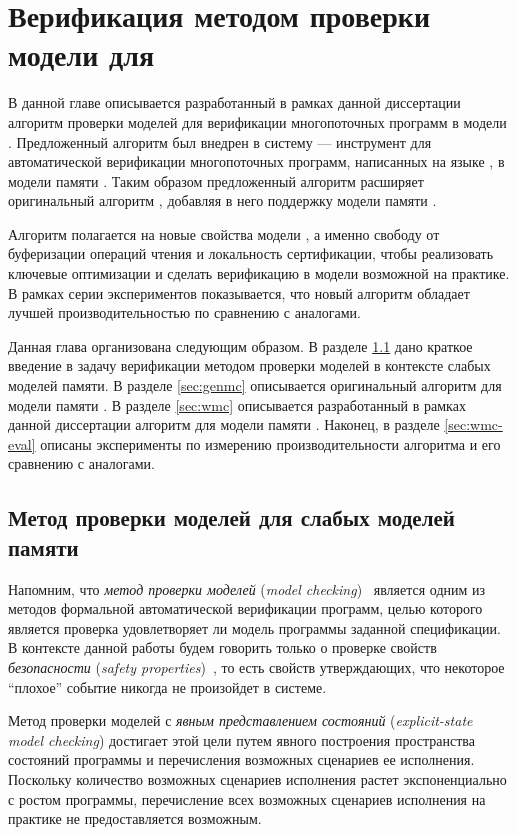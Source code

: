 \chapter{Верификация методом проверки модели для \WkmS}
\label{ch:mc-weakestmo2}

В данной главе описывается разработанный в рамках данной диссертации 
алгоритм проверки моделей \wmc для верификации 
многопоточных программ в модели \WkmS.
Предложенный алгоритм был внедрен в систему \genmc --- 
инструмент для автоматической верификации многопоточных программ, 
написанных на языке \CLANG, в модели памяти \RCMM. 
Таким образом предложенный алгоритм \wmc расширяет 
оригинальный алгоритм \genmc, добавляя в него 
поддержку модели памяти \WkmS.  

Алгоритм \wmc полагается на новые свойства модели \WkmS, 
а именно свободу от буферизации операций чтения и 
локальность сертификации, чтобы реализовать ключевые 
оптимизации и сделать верификацию в модели \WkmS возможной на практике.  
В рамках серии экспериментов показывается, что 
новый алгоритм \wmc обладает лучшей производительностью 
по сравнению с аналогами.

Данная глава организована следующим образом. 
В разделе \ref{sec:mc-wmm} дано краткое введение 
в задачу верификации методом проверки моделей 
в контексте слабых моделей памяти.
В разделе \ref{sec:genmc} описывается оригинальный алгоритм 
\genmc для модели памяти \RCMM.
В разделе \ref{sec:wmc} описывается разработанный в 
рамках данной диссертации алгоритм \wmc для модели памяти \WkmS.
Наконец, в разделе \ref{sec:wmc-eval} описаны эксперименты 
по измерению производительности алгоритма \wmc и его сравнению с аналогами.

\section{Метод проверки моделей для слабых моделей памяти}
\label{sec:mc-wmm}

Напомним, что \emph{метод проверки моделей} (\emph{model checking})~\cite{Baier:2008} 
является одним из методов формальной автоматической верификации программ,
целью которого является проверка удовлетворяет ли 
модель программы заданной спецификации. 
В контексте данной работы будем говорить только 
о проверке свойств \emph{безопасности} (\emph{safety properties})~\cite{Baier:2008}, 
то есть свойств утверждающих, что некоторое 
``плохое'' событие никогда не произойдет в системе. 

Метод проверки моделей с \emph{явным представлением состояний} 
(\emph{explicit-state model checking}) достигает 
этой цели путем явного построения пространства состояний программы 
и перечисления возможных сценариев ее исполнения.
Поскольку количество возможных сценариев исполнения 
растет экспоненциально с ростом программы, 
перечисление всех возможных сценариев исполнения 
на практике не предоставляется возможным. 

